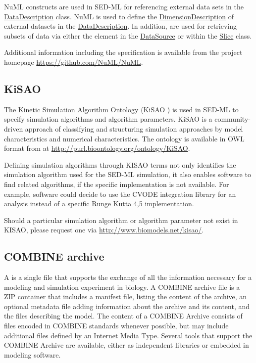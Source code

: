 NuML constructs are used in SED-ML for referencing external data sets in the \hyperref[class:dataDescription]{DataDescription} class. NuML is used to define the \hyperref[sec:dimensionDescription]{DimensionDescription} of external datasets in the \hyperref[class:dataDescription]{DataDescription}. In addition, \hyperref[type:numlsid]{} are used for retrieving subsets of data via either the \hyperref[sec:indexSet]{} element in the \hyperref[class:dataSource]{DataSource} or within the \hyperref[class:slice]{Slice} class.

Additional information including the specification is available from the project homepage \url{https://github.com/NuML/NuML}.

\subsection{KiSAO}
\label{sec:kisao}
The Kinetic Simulation Algorithm Ontology (KiSAO \citep{CWK+10}) is used in SED-ML to specify simulation algorithms and algorithm parameters. KiSAO is a community-driven approach of classifying and structuring simulation approaches by model characteristics and numerical characteristics. The ontology is available  in OWL format from  at \url{http://purl.bioontology.org/ontology/KiSAO}. 

Defining simulation algorithms through KISAO terms not only identifies the simulation algorithm used for the SED-ML simulation, it also enables software to find related algorithms, if the specific implementation is not available. For example, software could decide to use the CVODE integration library for an analysis instead of a specific Runge Kutta 4,5 implementation. 

Should a particular simulation algorithm or algorithm parameter not exist in KISAO, please 
request one via \url{http://www.biomodels.net/kisao/}.

\subsection{COMBINE archive}
\label{sec:archive}

A  \citep{Bergmann2014} is a single file that supports the exchange of all the information necessary for a modeling and simulation experiment in biology. A COMBINE archive file is a ZIP container that includes a manifest file, listing the content of the archive, an optional metadata file adding information about the archive and its content, and the files describing the model. The content of a COMBINE Archive consists of files encoded in COMBINE standards whenever possible, but may include additional files defined by an Internet Media Type. Several tools that support the COMBINE Archive are available, either as independent libraries or embedded in modeling software.

